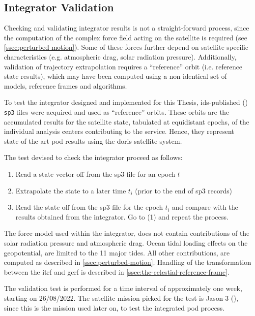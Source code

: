 \subsection{Integrator Validation}\label{sec:integrator-validation}

Checking and validating integrator results is not a straight-forward process, since 
the computation of the complex force field acting on the satellite is required 
(see \autoref{ssec:perturbed-motion}). Some of these forces further depend on 
satellite-specific characteristics (e.g. atmospheric drag, solar radiation 
pressure). Additionally, validation of trajectory extrapolation requires a ``reference'' 
orbit (i.e. reference state results), which may have been computed using a non 
identical set of models, reference frames and algorithms.

To test the integrator designed and implemented for this Thesis, \gls{ids}-published 
(\cite{Willis2016}) \texttt{sp3} files were acquired and used as ``reference'' orbits. 
These orbits are the accumulated results for the satellite state, tabulated at 
equidistant epochs, of the individual analysis centers contributing to the service. 
Hence, they represent state-of-the-art \gls{pod} results using the \gls{doris} 
satellite system.

The test devised to check the integrator proceed as follows:
\begin{enumerate}
  \item Read a state vector off from the sp3 file for an epoch $t$
  \item Extrapolate the state to a later time $t_i$ (prior to the end of sp3 records)
  \item Read the state off from the sp3 file for the epoch $t_i$ and compare 
    with the results obtained from the integrator. Go to (1) and repeat the 
    process.
\end{enumerate}
The force model used within the integrator, does not contain contributions of the 
solar radiation pressure and atmospheric drag. Ocean tidal loading effects on the 
geopotential, are limited to the 11 major tides. All other contributions, are 
computed as described in \autoref{ssec:perturbed-motion}. Handling of the 
transformation between the \gls{itrf} and \gls{gcrf} is described in 
\autoref{ssec:the-celestial-reference-frame}.

The validation test is performed for a time interval of approximately one week, 
starting on 26/08/2022. The satellite mission picked for the test is Jason-3 
(\cite{Bannoura2011}), since this is the mission used later on, to test the 
integrated \gls{pod} process.

